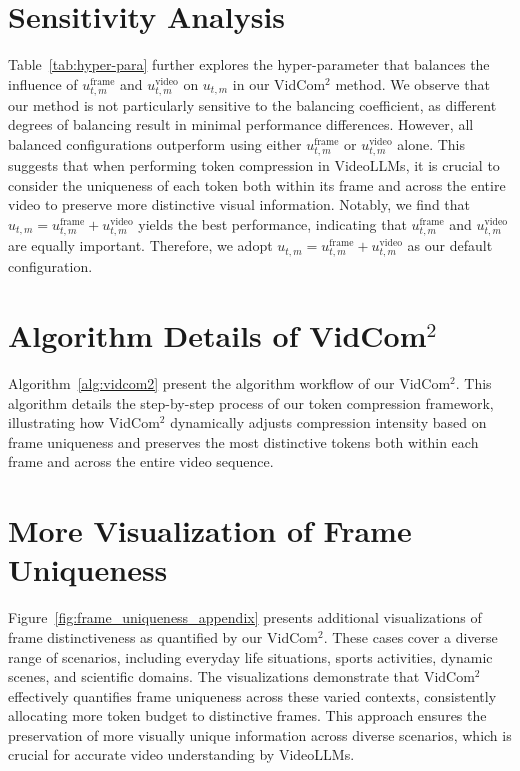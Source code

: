 \begin{itemize}
\end{itemize}


\section{Sensitivity Analysis}
\label{sec:appendix/hyper-para}



Table~\ref{tab:hyper-para} further explores the hyper-parameter that balances the influence of $u^\mathrm{frame}_{t,m}$ and $u^\mathrm{video}_{t,m}$ on $u_{t,m}$ in our VidCom$^2$ method. We observe that our method is not particularly sensitive to the balancing coefficient, as different degrees of balancing result in minimal performance differences. However, all balanced configurations outperform using either $u^\mathrm{frame}_{t,m}$ or $u^\mathrm{video}_{t,m}$ alone. This suggests that when performing token compression in VideoLLMs, it is crucial to consider the uniqueness of each token both within its frame and across the entire video to preserve more distinctive visual information. Notably, we find that $u_{t,m} = u^\mathrm{frame}_{t,m}+u^\mathrm{video}_{t,m}$ yields the best performance, indicating that $u^\mathrm{frame}_{t,m}$ and $u^\mathrm{video}_{t,m}$ are equally important. Therefore, we adopt $u_{t,m} = u^\mathrm{frame}_{t,m}+u^\mathrm{video}_{t,m}$ as our default configuration.







\section{Algorithm Details of VidCom$^2$}
\label{sec:appendix/algorithm}

Algorithm~\ref{alg:vidcom2} present the algorithm workflow of our VidCom$^2$. This algorithm details the step-by-step process of our token compression framework, illustrating how VidCom$^2$ dynamically adjusts compression intensity based on frame uniqueness and preserves the most distinctive tokens both within each frame and across the entire video sequence.


\section{More Visualization of Frame Uniqueness}
\label{sec:appendix/more_vis}

Figure~\ref{fig:frame_uniqueness_appendix} presents additional visualizations of frame distinctiveness as quantified by our VidCom$^2$. These cases cover a diverse range of scenarios, including everyday life situations, sports activities, dynamic scenes, and scientific domains. The visualizations demonstrate that VidCom$^2$ effectively quantifies frame uniqueness across these varied contexts, consistently allocating more token budget to distinctive frames. This approach ensures the preservation of more visually unique information across diverse scenarios, which is crucial for accurate video understanding by VideoLLMs.


